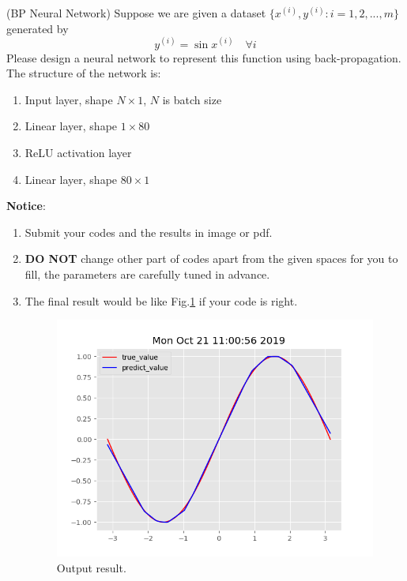 \documentclass[a4paper, 12pt, answers]{exam}
\begin{document}
\begin{questions}
\question (BP Neural Network) Suppose we are given a dataset $\{x^{(i)},y^{(i)}: i=1,2,...,m \}$ generated by
\begin{equation}
y^{(i)} = \sin x^{(i)} \quad \forall i
\end{equation}
Please design a neural network to represent this function using back-propagation. The structure of the network is:

\begin{enumerate}
\item Input layer, shape $N\times 1$, $N$ is batch size
\item Linear layer, shape $1\times 80$
\item ReLU activation layer
\item Linear layer, shape $80\times 1$

\end{enumerate}
\end{questions}
\begin{flushleft}
\textbf{Notice}: \\
\begin{enumerate}
\item Submit your codes and the results in image or pdf.
\item \textbf{DO NOT} change other part of codes apart from the given spaces for you to fill, the parameters are carefully tuned in advance.
\item The final result would be like Fig.\ref{fig1} if your code is right.

\begin{figure}[htbp]
\centering
\includegraphics[width=5in]{1.png}
\caption{Output result.}\label{fig1}
\end{figure}

\end{enumerate}
\end{flushleft}




\end{document}
